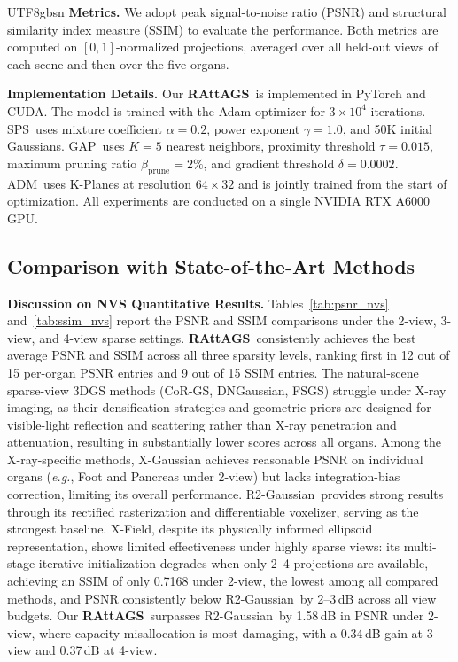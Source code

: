 \documentclass{egpubl}
\newcommand{\traceplain}{RAttAGS}
\newcommand{\RAttAGS}{\textbf{\traceplain}}
\newcommand{\sps}{SPS}
\newcommand{\gap}{GAP}
\newcommand{\adm}{ADM}
\newcommand{\rtwo}{R2-Gaussian}
\begin{document}
\begin{CJK*}{UTF8}{gbsn}
\textbf{Metrics.} We adopt peak signal-to-noise ratio (PSNR) and structural similarity index measure (SSIM) to evaluate the performance. Both metrics are computed on $[0,1]$-normalized projections, averaged over all held-out views of each scene and then over the five organs.

\textbf{Implementation Details.} Our \RAttAGS\ is implemented in PyTorch and CUDA. The model is trained with the Adam optimizer for $3\!\times\!10^{4}$ iterations. \sps\ uses mixture coefficient $\alpha\!=\!0.2$, power exponent $\gamma\!=\!1.0$, and 50K initial Gaussians. \gap\ uses $K\!=\!5$ nearest neighbors, proximity threshold $\tau\!=\!0.015$, maximum pruning ratio $\beta_{\text{prune}}\!=\!2\%$, and gradient threshold $\delta\!=\!0.0002$. \adm\ uses K-Planes at resolution $64\!\times\!32$ and is jointly trained from the start of optimization. All experiments are conducted on a single NVIDIA RTX A6000 GPU.

\subsection{Comparison with State-of-the-Art Methods}
\label{sec:comparison}



\textbf{Discussion on NVS Quantitative Results.} Tables~\ref{tab:psnr_nvs} and~\ref{tab:ssim_nvs} report the PSNR and SSIM comparisons under the 2-view, 3-view, and 4-view sparse settings. \RAttAGS\ consistently achieves the best average PSNR and SSIM across all three sparsity levels, ranking first in 12 out of 15 per-organ PSNR entries and 9 out of 15 SSIM entries. The natural-scene sparse-view 3DGS methods (CoR-GS, DNGaussian, FSGS) struggle under X-ray imaging, as their densification strategies and geometric priors are designed for visible-light reflection and scattering rather than X-ray penetration and attenuation, resulting in substantially lower scores across all organs. Among the X-ray-specific methods, X-Gaussian achieves reasonable PSNR on individual organs (\emph{e.g.}, Foot and Pancreas under 2-view) but lacks integration-bias correction, limiting its overall performance. \rtwo\ provides strong results through its rectified rasterization and differentiable voxelizer, serving as the strongest baseline. X-Field, despite its physically informed ellipsoid representation, shows limited effectiveness under highly sparse views: its multi-stage iterative initialization degrades when only 2--4 projections are available, achieving an SSIM of only 0.7168 under 2-view, the lowest among all compared methods, and PSNR consistently below \rtwo\ by 2--3\,dB across all view budgets. Our \RAttAGS\ surpasses \rtwo\ by 1.58\,dB in PSNR under 2-view, where capacity misallocation is most damaging, with a 0.34\,dB gain at 3-view and 0.37\,dB at 4-view.


\end{CJK*}
\end{document}
